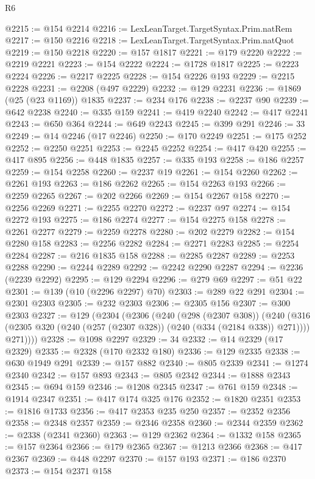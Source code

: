 \begin{lexlean}{R6}
\begin{coremodule}
{{{{{{{{{{{{{{{{{{{{{{{{{{{{{{{{{{{{{{{{{{{{{{{{{{{{{{{{{{{{{{{{{{{{{{{{@2215 := @154 @2214
@2216 := LexLeanTarget.TargetSyntax.Prim.natRem
@2217 := @150 @2216
@2218 := LexLeanTarget.TargetSyntax.Prim.natQuot
@2219 := @150 @2218
@2220 := @157 @1817
@2221 := @179 @2220
@2222 := @2219 @2221
@2223 := @154 @2222
@2224 := @1728 @1817
@2225 := @2223 @2224
@2226 := @2217 @2225
@2228 := @154 @2226 @193
@2229 := @2215 @2228
@2231 := @2208 (@497 @2229)
@2232 := @129 @2231
@2236 := @1869 (@25 (@23 @1169)) @1835
@2237 := @234 @176
@2238 := @2237 @90
@2239 := @642 @2238
@2240 := @335 @159
@2241 := @419 @2240
@2242 := @417 @2241
@2243 := @650 @364
@2244 := @649 @2243
@2245 := @399 @291
@2246 := 33
@2249 := @14 @2246 (@17 @2246)
@2250 := @170 @2249
@2251 := @175 @252
@2252 := @2250 @2251
@2253 := @2245 @2252
@2254 := @417 @420
@2255 := @417 @895
@2256 := @448 @1835
@2257 := @335 @193
@2258 := @186 @2257
@2259 := @154 @2258
@2260 := @2237 @19
@2261 := @154 @2260
@2262 := @2261 @193
@2263 := @186 @2262
@2265 := @154 @2263 @193
@2266 := @2259 @2265
@2267 := @202 @2266
@2269 := @154 @2267 @158
@2270 := @2256 @2269
@2271 := @2255 @2270
@2272 := @2237 @97
@2274 := @154 @2272 @193
@2275 := @186 @2274
@2277 := @154 @2275 @158
@2278 := @2261 @2277
@2279 := @2259 @2278
@2280 := @202 @2279
@2282 := @154 @2280 @158
@2283 := @2256 @2282
@2284 := @2271 @2283
@2285 := @2254 @2284
@2287 := @216 @1835 @158
@2288 := @2285 @2287
@2289 := @2253 @2288
@2290 := @2244 @2289
@2292 := @2242 @2290 @2287
@2294 := @2236 (@2239 @2292)
@2295 := @129 @2294
@2296 := @279 @69
@2297 := @51 @22
@2301 := @139 (@10 (@2296 @2297) @70)
@2303 := @289 @22 @291
@2304 := @2301 @2303
@2305 := @232 @2303
@2306 := @2305 @156
@2307 := @300 @2303
@2327 := @129
    (@2304
      (@2306
        (@240
          (@298 (@2307 @308))
          (@240
            (@316 (@2305 @320 (@240 (@257 (@2307 @328)) (@240 (@334 (@2184 @338)) @271))))
            @271))))
@2328 := @1098 @2297
@2329 := 34
@2332 := @14 @2329 (@17 @2329)
@2335 := @2328 (@170 @2332 @180)
@2336 := @129 @2335
@2338 := @630 @1949 @291
@2339 := @157 @882
@2340 := @805 @2339
@2341 := @1274 @2340
@2342 := @157 @893
@2343 := @805 @2342
@2344 := @1888 @2343
@2345 := @694 @159
@2346 := @1208 @2345
@2347 := @761 @159
@2348 := @1914 @2347
@2351 := @417 @174 @325 @176
@2352 := @1820 @2351
@2353 := @1816 @1733
@2356 := @417 @2353 @235 @250
@2357 := @2352 @2356
@2358 := @2348 @2357
@2359 := @2346 @2358
@2360 := @2344 @2359
@2362 := @2338 (@2341 @2360)
@2363 := @129 @2362
@2364 := @1332 @158
@2365 := @157 @2364
@2366 := @179 @2365
@2367 := @1213 @2366
@2368 := @417 @2367
@2369 := @448 @2297
@2370 := @157 @193
@2371 := @186 @2370
@2373 := @154 @2371 @158
}}}}}}}}}}}}}}}}}}}}}}}}}}}}}}}}}}}}}}}}}}}}}}}}}}}}}}}}}}}}}}}}}}}}}}}}
\end{coremodule}
\end{lexlean}

